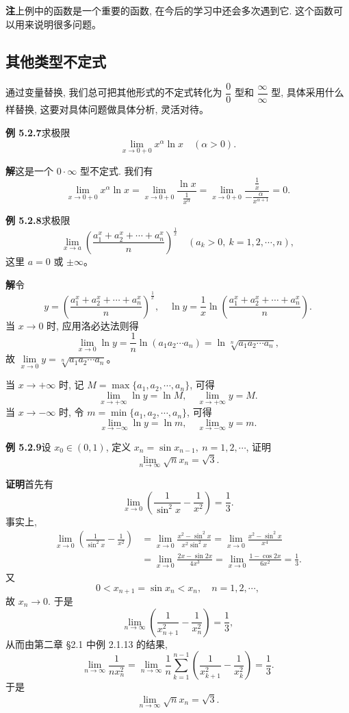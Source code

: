 \documentclass[UTF8,12pt,a4paper,fontset=fandol]{ctexart}
\begin{document}
\noindent\textbf{注}\quad 上例中的函数是一个重要的函数, 在今后的学习中还会多次遇到它. 这个函数可以用来说明很多问题。

\subsection{其他类型不定式}

通过变量替换, 我们总可把其他形式的不定式转化为 $\dfrac00$ 型和 $\dfrac\infty\infty$ 型, 具体采用什么样替换, 这要对具体问题做具体分析, 灵活对待。

\noindent\textbf{例 5.2.7}\quad 求极限
\[
  \lim_{x\to0+0}x^\alpha\ln x\quad(\alpha>0).
\]

\noindent\textbf{解}\quad 这是一个 $0\cdot\infty$ 型不定式. 我们有
\[
  \lim_{x\to0+0}x^\alpha\ln x
  =
  \lim_{x\to0+0}\frac{\ln x}{\frac1{x^\alpha}}
  =
  \lim_{x\to0+0}\frac{\frac1x}{-\frac{\alpha}{x^{\alpha+1}}}
  =
  0.
\]

\noindent\textbf{例 5.2.8}\quad 求极限
\[
  \lim_{x\to a}\left(\frac{a_1^x+a_2^x+\cdots+a_n^x}{n}\right)^{\frac1x}
  \quad (a_k>0,\ k=1,2,\cdots,n),
\]
这里 $a=0$ 或 $\pm\infty$。

\noindent\textbf{解}\quad 令
\[
  y=\left(\frac{a_1^x+a_2^x+\cdots+a_n^x}{n}\right)^{\frac1x},
  \quad
  \ln y=\frac1x\ln\left(\frac{a_1^x+a_2^x+\cdots+a_n^x}{n}\right).
\]
当 $x\to0$ 时, 应用洛必达法则得
\[
  \lim_{x\to0}\ln y
  =
  \frac1n\ln(a_1a_2\cdots a_n)
  =
  \ln\sqrt[n]{a_1a_2\cdots a_n},
\]
故 $\lim\limits_{x\to0}y=\sqrt[n]{a_1a_2\cdots a_n}$。

当 $x\to+\infty$ 时, 记 $M=\max\{a_1,a_2,\cdots,a_n\}$, 可得
\[
  \lim_{x\to+\infty}\ln y=\ln M,\quad
  \lim_{x\to+\infty}y=M.
\]
当 $x\to-\infty$ 时, 令 $m=\min\{a_1,a_2,\cdots,a_n\}$, 可得
\[
  \lim_{x\to-\infty}\ln y=\ln m,\quad
  \lim_{x\to-\infty}y=m.
\]

\noindent\textbf{例 5.2.9}\quad 设 $x_0\in(0,1)$, 定义 $x_n=\sin x_{n-1},\ n=1,2,\cdots$, 证明
\[
  \lim_{n\to\infty}\sqrt{n}x_n=\sqrt3.
\]

\noindent\textbf{证明}\quad 首先有
\[
  \lim_{x\to0}\left(\frac1{\sin^2x}-\frac1{x^2}\right)=\frac13.
\]
事实上,
\[
\begin{aligned}
  \lim_{x\to0}\left(\frac1{\sin^2x}-\frac1{x^2}\right)
  &=
  \lim_{x\to0}\frac{x^2-\sin^2x}{x^2\sin^2x}
  =
  \lim_{x\to0}\frac{x^2-\sin^2x}{x^4} \\
  &=
  \lim_{x\to0}\frac{2x-\sin2x}{4x^3}
  =
  \lim_{x\to0}\frac{1-\cos2x}{6x^2}
  =
  \frac13.
\end{aligned}
\]
又
\[
  0<x_{n+1}=\sin x_n<x_n,\quad n=1,2,\cdots,
\]
故 $x_n\to0$. 于是
\[
  \lim_{n\to\infty}\left(\frac1{x_{n+1}^2}-\frac1{x_n^2}\right)=\frac13,
\]
从而由第二章 §2.1 中例 2.1.13 的结果,
\[
  \lim_{n\to\infty}\frac1{nx_n^2}
  =
  \lim_{n\to\infty}\frac1n\sum_{k=1}^{n-1}
  \left(\frac1{x_{k+1}^2}-\frac1{x_k^2}\right)
  =
  \frac13.
\]
于是
\[
  \lim_{n\to\infty}\sqrt{n}x_n=\sqrt3.
\]
\end{document}
